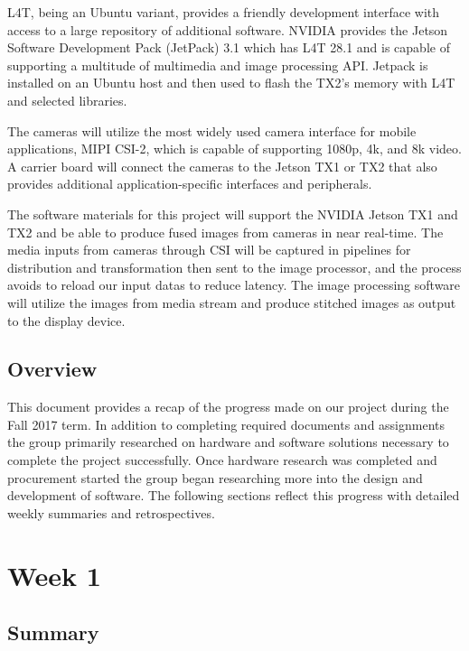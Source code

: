 \documentclass[letterpaper,10pt,serif,draftclsnofoot,onecolumn,compsoc,titlepage]{IEEEtran}
\begin{document}
L4T, being an Ubuntu variant, provides a friendly development interface with access to a large repository of additional software.
NVIDIA provides the Jetson Software Development Pack (JetPack) 3.1 which has L4T 28.1 
and is capable of supporting a multitude of multimedia and image processing API. Jetpack is installed on an Ubuntu host and then used to flash the TX2's memory with L4T and selected libraries.

The cameras will utilize the most widely used camera interface for mobile applications, 
MIPI CSI-2, which is capable of supporting 1080p, 4k, and 8k video. 
A carrier board will connect the cameras to the Jetson TX1 or TX2 that also provides 
additional application-specific interfaces and peripherals.

The software materials for this project will support the NVIDIA Jetson TX1 and TX2 and 
be able to produce fused images from cameras in near real-time. The media inputs from 
cameras through CSI will be captured in pipelines for distribution and transformation 
then sent to the image processor, and the process avoids to reload our input datas to 
reduce latency. The image processing software will utilize the images from media stream 
and produce stitched images as output to the display device.  \\


\subsection{Overview}

This document provides a recap of the progress made on our project during the 
Fall 2017 term. 
In addition to completing required documents and assignments the group primarily 
researched on hardware and software solutions necessary to complete the project 
successfully. Once hardware research was completed and procurement started the group 
began researching more into the design and development of software. The following 
sections reflect this progress with detailed weekly summaries and retrospectives. \\

\section{Week 1}

\subsection{Summary}
\end{document}
